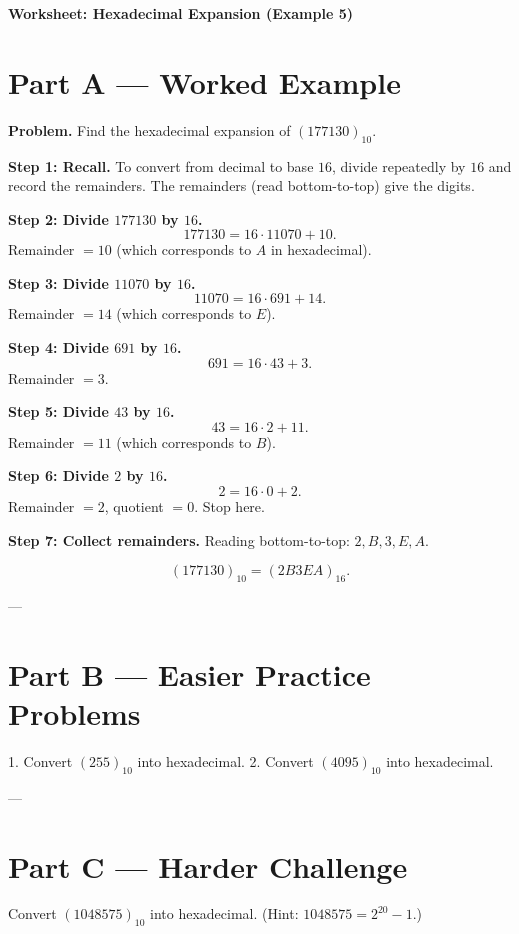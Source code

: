 \documentclass[12pt]{article}
\begin{document}
\begin{center}
\Large\textbf{Worksheet: Hexadecimal Expansion (Example 5)}
\end{center}

\section*{Part A — Worked Example}

\textbf{Problem.} Find the hexadecimal expansion of $(177130)_{10}$.

\textbf{Step 1: Recall.} To convert from decimal to base $16$, divide repeatedly by $16$ and record the remainders. The remainders (read bottom-to-top) give the digits.

\medskip
\textbf{Step 2: Divide $177130$ by $16$.}
\[
177130 = 16 \cdot 11070 + 10.
\]
Remainder $=10$ (which corresponds to $A$ in hexadecimal).

\medskip
\textbf{Step 3: Divide $11070$ by $16$.}
\[
11070 = 16 \cdot 691 + 14.
\]
Remainder $=14$ (which corresponds to $E$).

\medskip
\textbf{Step 4: Divide $691$ by $16$.}
\[
691 = 16 \cdot 43 + 3.
\]
Remainder $=3$.

\medskip
\textbf{Step 5: Divide $43$ by $16$.}
\[
43 = 16 \cdot 2 + 11.
\]
Remainder $=11$ (which corresponds to $B$).

\medskip
\textbf{Step 6: Divide $2$ by $16$.}
\[
2 = 16 \cdot 0 + 2.
\]
Remainder $=2$, quotient $=0$. Stop here.

\medskip
\textbf{Step 7: Collect remainders.} Reading bottom-to-top: $2, B, 3, E, A$.

\[
(177130)_{10} = (2B3EA)_{16}.
\]


---

\section*{Part B — Easier Practice Problems}
1. Convert $(255)_{10}$ into hexadecimal.
2. Convert $(4095)_{10}$ into hexadecimal.

\vspace{2cm}

---

\section*{Part C — Harder Challenge}
Convert $(1048575)_{10}$ into hexadecimal. (Hint: $1048575 = 2^{20} - 1$.)

\vspace{3cm}
\end{document}
